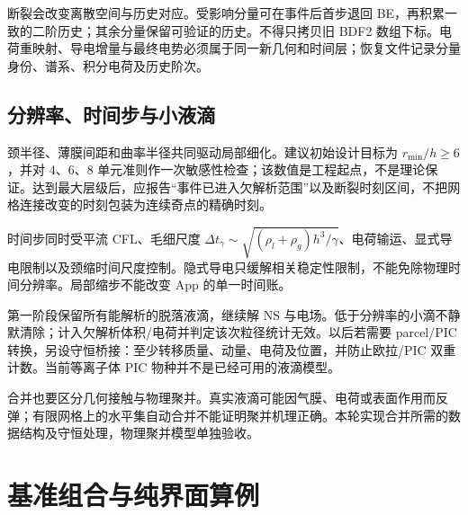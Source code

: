 \documentclass[11pt,a4paper]{article}
\begin{document}
断裂会改变离散空间与历史对应。受影响分量可在事件后首步退回 BE，再积累一致的二阶历史；其余分量保留可验证的历史。不得只拷贝旧 BDF2 数组下标。电荷重映射、导电增量与最终电势必须属于同一新几何和时间层；恢复文件记录分量身份、谱系、积分电荷及历史阶次。

\subsection{分辨率、时间步与小液滴}
颈半径、薄膜间距和曲率半径共同驱动局部细化。建议初始设计目标为 $r_{\min}/h\geq 6$，并对 4、6、8 单元准则作一次敏感性检查；该数值是工程起点，不是理论保证。达到最大层级后，应报告“事件已进入欠解析范围”以及断裂时刻区间，不把网格连接改变的时刻包装为连续奇点的精确时刻。

时间步同时受平流 CFL、毛细尺度 $\Delta t_\gamma\sim\sqrt{(\rho_l+\rho_g)h^3/\gamma}$、电荷输运、显式导电限制以及颈缩时间尺度控制。隐式导电只缓解相关稳定性限制，不能免除物理时间分辨率。局部缩步不能改变 App 的单一时间账。

第一阶段保留所有能解析的脱落液滴，继续解 NS 与电场。低于分辨率的小滴不静默清除；计入欠解析体积/电荷并判定该次粒径统计无效。以后若需要 parcel/PIC 转换，另设守恒桥接：至少转移质量、动量、电荷及位置，并防止欧拉/PIC 双重计数。当前等离子体 PIC 物种并不是已经可用的液滴模型。

合并也要区分几何接触与物理聚并。真实液滴可能因气膜、电荷或表面作用而反弹；有限网格上的水平集自动合并不能证明聚并机理正确。本轮实现合并所需的数据结构及守恒处理，物理聚并模型单独验收。

\clearpage
\section{基准组合与纯界面算例}
\end{document}
